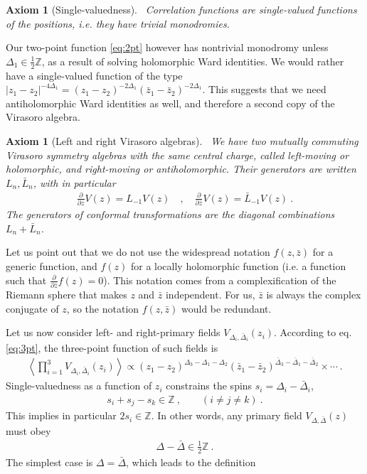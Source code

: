 \documentclass[12pt, a4paper]{article}
\theoremstyle{break}
\newtheorem{hyp}[exo]{Axiom}
\begin{document}
\begin{hyp}[Single-valuedness]
 ~\label{hyp:sv}
 Correlation functions are single-valued functions of the positions, i.e. they have trivial monodromies.
\end{hyp}
Our two-point function \eqref{eq:2pt} however has nontrivial monodromy unless $\Delta_1\in \frac12\mathbb{Z}$, as a  result of solving holomorphic Ward identities. 
We would rather have a single-valued function of the type $|z_1-z_2|^{-4\Delta_1} = (z_1-z_2)^{-2\Delta_1} (\bar z_1-\bar z_2)^{-2\Delta_1}$.
This suggests that we need antiholomorphic Ward identities as well, and therefore a second copy of the Virasoro algebra.

\begin{hyp}[Left and right Virasoro algebras]
 ~\label{hyp:lr}
 We have two mutually commuting Virasoro symmetry algebras with the same central charge, called left-moving or holomorphic, and right-moving or antiholomorphic. Their generators are written $L_n,\bar L_n$, with in particular
 \begin{align}
  \frac{\partial}{\partial z} V(z) = L_{-1}V(z)   \quad , \quad \frac{\partial}{\partial \bar z} V(z)= \bar L_{-1} V(z)   \ .
 \end{align}
 The generators of conformal transformations are the diagonal combinations $L_n+\bar L_n$.
\end{hyp}
Let us point out that we do not use the widespread notation $f(z,\bar z)$ for a generic function, and $f(z)$ for a locally holomorphic function (i.e. a function such that $\frac{\partial}{\partial \bar z}f(z)=0$). This notation comes from a complexification of the Riemann sphere that makes $z$ and $\bar z$ independent. For us, $\bar z$ is always the complex conjugate of $z$, so the notation $f(z,\bar z)$ would be redundant. 

Let us now consider left- and right-primary fields $V_{\Delta_i,\bar\Delta_i}(z_i)$. According to eq. \eqref{eq:3pt}, the three-point function of such fields is 
\begin{align}
 \left<\prod_{i=1}^3V_{\Delta_i,\bar\Delta_i}(z_i) \right> \propto (z_1-z_2)^{\Delta_3-\Delta_1-\Delta_2} (\bar z_1-\bar z_2)^{\bar\Delta_3-\bar\Delta_1-\bar\Delta_2} \times \cdots\ .
 \label{eq:sv3}
\end{align}
Single-valuedness as a function of $z_i$ constrains the spins $s_i=\Delta_i-\bar\Delta_i$, 
\begin{align}
 s_i+s_j-s_k \in \mathbb{Z}\ , \qquad (i\neq j\neq k)\ .
\end{align}
This implies in particular $2s_i\in\mathbb{Z}$. In other words, any primary field $V_{\Delta,\bar\Delta}(z)$ must obey
\begin{align}
 \Delta -\bar \Delta \in \frac12\mathbb{Z}\ .
\end{align} 
The simplest case is $\Delta=\bar\Delta$, which leads to the definition
\end{document}
